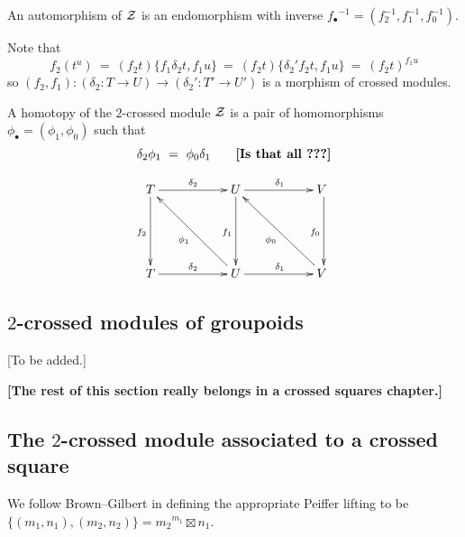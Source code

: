 \noindent
An automorphism of $\mathcal{Z}$ is an endomorphism with inverse
${f_{\bullet}}^{-1} = (f_2^{-1},f_1^{-1},f_0^{-1})$.

Note that
$$
f_2(t^u) ~=~ (f_2t)\{f_1\delta_2t,f_1u\}
         ~=~ (f_2t)\{\delta_2'f_2t,f_1u\}
         ~=~ (f_2t)^{f_1u}
$$
so $(f_2,f_1) : (\delta_2 : T \to U) \to (\delta_2' : T' \to U')$ 
is a morphism of crossed modules.

\begin{defn} 
A homotopy of the $2$-crossed module $\mathcal{Z}$
is a pair of homomorphisms $\phi_{\bullet} = (\phi_1,\phi_0)$
such that 
$$
\delta_2\phi_1 ~=~ \phi_0\delta_1 \qquad\mbox{{\bf [Is that all~???]}}
$$
\end{defn}
$$
\xymatrix{
    T \ar[rr]^{\delta_2} \ar[dd]_{f_2}
    &&  U \ar[rr]^{\delta_1} \ar[dd]_{f_1}
        && V~ \ar[dd]_{f_0} \\
    &&  &&  \\
    T \ar[rr]^{\delta_2} 
    &&  U \ar[rr]^{\delta_1} \ar[lluu]^{\phi_1}
        && V~ \ar[lluu]^{\phi_0}  \\
}
$$



\subsection{$2$-crossed modules of groupoids}  \label{subsec:2xmod-gpd}

[To be added.]





\newpage
\vspace*{5mm}
\begin{center}
{\bf [The rest of this section really belongs in a crossed squares chapter.]}
\end{center}

\vspace*{10mm}
\subsection{The $2$-crossed module associated to a crossed square}

We follow Brown--Gilbert \cite{brow:gilb} in defining the appropriate 
Peiffer lifting to be 
$\{(m_1, n_1),(m_2,n_2) \} = {m_2}^{m_1} \boxtimes n_1$.


